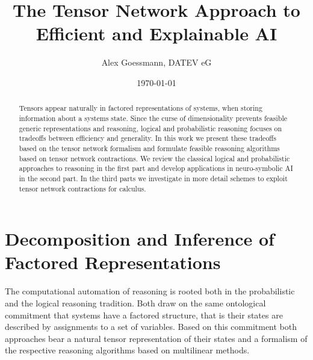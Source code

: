 \documentclass[aps,onecolumn,nofootinbib,pra]{article}
\begin{document}
\title{The Tensor Network Approach to Efficient and Explainable AI}
\author{Alex Goessmann, DATEV eG}

\maketitle
\date{\today}

\begin{abstract}
	Tensors appear naturally in factored representations of systems, when storing information about a systems state.
	Since the curse of dimensionality prevents feasible generic representations and reasoning, logical and probabilistic reasoning focuses on tradeoffs between efficiency and generality.
	In this work we present these tradeoffs based on the tensor network formalism and formulate feasible reasoning algorithms based on tensor network contractions.
	We review the classical logical and probabilistic approaches to reasoning in the first part and develop applications in neuro-symbolic AI in the second part.
	In the third parts we investigate in more detail schemes to exploit tensor network contractions for calculus.
\end{abstract}	

\tableofcontents




\part{Decomposition and Inference of Factored Representations}

The computational automation of reasoning is rooted both in the probabilistic and the logical reasoning tradition.
Both draw on the same ontological commitment that systems have a factored structure, that is their states are described by assignments to a set of variables.
Based on this commitment both approaches bear a natural tensor representation of their states and a formalism of the respective reasoning algorithms based on multilinear methods.








\end{document}
